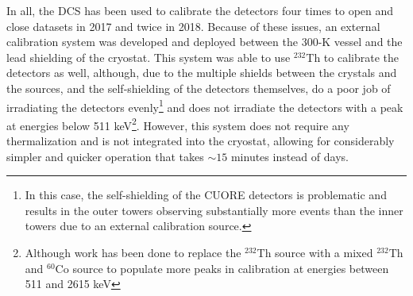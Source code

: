 In all, the DCS has been used to calibrate the detectors four times to open and close datasets in 2017 and twice in 2018.
Because of these issues, an external calibration system was developed and deployed between the 300-K vessel and the lead shielding of the cryostat.
This system was able to use $^{232}$Th to calibrate the detectors as well, although, due to the multiple shields between the crystals and the sources, and the self-shielding of the detectors themselves, do a poor job of irradiating the detectors evenly\footnote{In this case, the self-shielding of the CUORE detectors is problematic and results in the outer towers observing substantially more events than the inner towers due to an external calibration source.} and does not irradiate the detectors with a peak at energies below 511 keV\footnote{Although work has been done to replace the $^{232}$Th source with a mixed $^{232}$Th and $^{60}$Co source to populate more peaks in calibration at energies between 511 and 2615 keV}.
However, this system does not require any thermalization and is not integrated into the cryostat, allowing for considerably simpler and quicker operation that takes $\sim15$ minutes instead of days.

